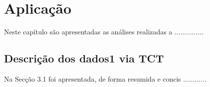\documentclass[Tese.tex]{subfiles}
\begin{document}
\chapter{Aplicação}

Neste capítulo são apresentadas as análises realizadas a ...............

\section{Descrição dos dados1 via TCT}

\justify
Na Secção 3.1 foi apresentada, de forma resumida e concis ............
\end{document}
